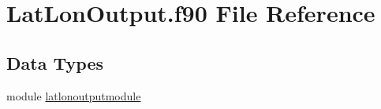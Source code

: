 \hypertarget{LatLonOutput_8f90}{\section{Lat\+Lon\+Output.\+f90 File Reference}
\label{LatLonOutput_8f90}
}
\subsection*{Data Types}
\begin{DoxyCompactItemize}
\item 
module \hyperlink{classlatlonoutputmodule}{latlonoutputmodule}
\end{DoxyCompactItemize}
